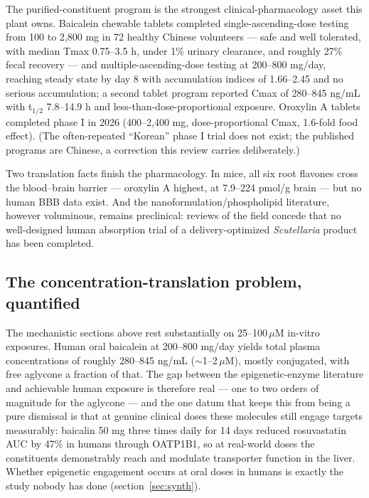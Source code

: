 The purified-constituent program is the strongest clinical-pharmacology asset this plant owns. Baicalein chewable tablets completed single-ascending-dose testing from 100 to 2{,}800 mg in 72 healthy Chinese volunteers --- safe and well tolerated, with median Tmax 0.75--3.5 h, under 1\% urinary clearance, and roughly 27\% fecal recovery --- and multiple-ascending-dose testing at 200--800 mg/day, reaching steady state by day 8 with accumulation indices of 1.66--2.45 and no serious accumulation; a second tablet program reported Cmax of 280--845 ng/mL with t$_{1/2}$ 7.8--14.9 h and less-than-dose-proportional exposure. Oroxylin A tablets completed phase I in 2026 (400--2{,}400 mg, dose-proportional Cmax, 1.6-fold food effect). (The often-repeated ``Korean'' phase I trial does not exist; the published programs are Chinese, a correction this review carries deliberately.)

Two translation facts finish the pharmacology. In mice, all six root flavones cross the blood--brain barrier --- oroxylin A highest, at 7.9--224 pmol/g brain --- but no human BBB data exist. And the nanoformulation/phospholipid literature, however voluminous, remains preclinical: reviews of the field concede that no well-designed human absorption trial of a delivery-optimized \textit{Scutellaria} product has been completed.

\subsection{The concentration-translation problem, quantified}

The mechanistic sections above rest substantially on 25--100\,$\mu$M in-vitro exposures. Human oral baicalein at 200--800 mg/day yields total plasma concentrations of roughly 280--845 ng/mL ($\sim$1--2\,$\mu$M), mostly conjugated, with free aglycone a fraction of that. The gap between the epigenetic-enzyme literature and achievable human exposure is therefore real --- one to two orders of magnitude for the aglycone --- and the one datum that keeps this from being a pure dismissal is that at genuine clinical doses these molecules still engage targets measurably: baicalin 50 mg three times daily for 14 days reduced rosuvastatin AUC by 47\% in humans through OATP1B1, so at real-world doses the constituents demonstrably reach and modulate transporter function in the liver. Whether epigenetic engagement occurs at oral doses in humans is exactly the study nobody has done (section~\ref{sec:synth}).

